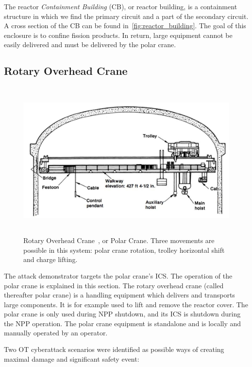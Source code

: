 The reactor \emph{Containment Building} (CB), or reactor building, is a containment structure in which we find the primary circuit and a part of the secondary circuit. A cross section of the CB can be found in~\autoref{fig:reactor_building}. The goal of this enclosure is to confine fission products. In return, large equipment cannot be easily delivered and must be delivered by the polar crane.

\subsection{Rotary Overhead Crane}

\begin{figure}[H]
    \centering
    \includegraphics[height=8cm]{figures/rotary_crane.jpg}
    \caption{Rotary Overhead Crane~\cite{ONR-polar-crane}, or Polar Crane.  Three movements are possible in this system: polar crane rotation, trolley horizontal shift and charge lifting.}
    \label{fig:polar_crane}
\end{figure}

The attack demonstrator targets the polar crane's ICS. The operation of the polar crane is explained in this section. The rotary overhead crane (called thereafter polar crane) is a handling equipment which delivers and transports large components. It is for example used to lift and remove the reactor cover. The polar crane is only used during NPP shutdown, and its ICS is shutdown during the NPP operation. The polar crane equipment is standalone and is locally and manually operated by an operator. 

Two OT cyberattack scenarios were identified as possible ways of creating maximal damage and significant safety event:

